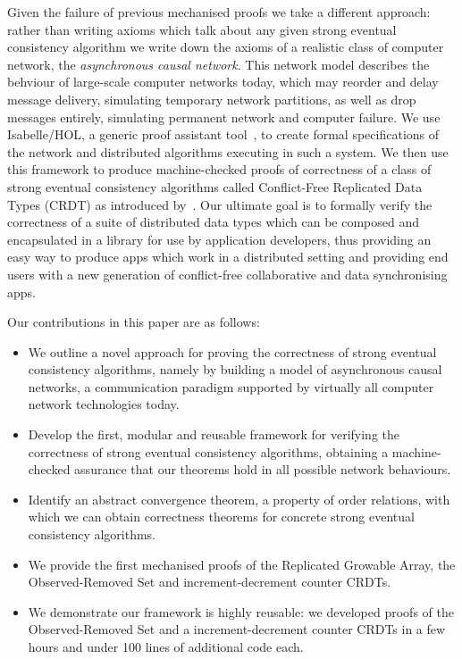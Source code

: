 \documentclass[acmlarge,review,anonymous]{acmart}\settopmatter{printfolios=true}
\begin{document}
Given the failure of previous mechanised proofs we take a different approach: rather than writing axioms which talk about any given strong eventual consistency algorithm we write down the axioms of a realistic class of computer network, the \emph{asynchronous causal network}.
This network model describes the behviour of large-scale computer networks today, which may reorder and delay message delivery, simulating temporary network partitions, as well as drop messages entirely, simulating permanent network and computer failure.
We use Isabelle/HOL, a generic proof assistant tool~\cite{DBLP:conf/tphol/WenzelPN08}, to create formal specifications of the network and distributed algorithms executing in such a system. 
We then use this framework to produce machine-checked proofs of correctness of a class of strong eventual consistency algorithms called Conflict-Free Replicated Data Types (CRDT) as introduced by~\citet{Shapiro:2011wy,Shapiro:2011un}. Our ultimate goal is to formally verify the correctness of a suite of distributed data types which can be composed and encapsulated in a library for use by application developers, thus providing an easy way to produce apps which work in a distributed setting and providing end users with a new generation of conflict-free collaborative and data synchronising apps.

Our contributions in this paper are as follows:
\begin{itemize}
\item We outline a novel approach for proving the correctness of strong eventual consistency algorithms, namely by building a model of asynchronous causal networks, a communication paradigm supported by virtually all computer network technologies today.
%
\item Develop the first, modular and reusable framework for verifying the correctness of strong eventual consistency algorithms, obtaining a machine-checked assurance that our theorems hold in all possible network behaviours.
%
\item Identify an abstract convergence theorem, a property of order relations, with which we can obtain correctness theorems for concrete strong eventual consistency algorithms.
%
\item We provide the first mechanised proofs of the Replicated Growable Array, the Observed-Removed Set and increment-decrement counter CRDTs. 
%
\item We demonstrate our framework is highly reusable: we developed proofs of the Observed-Removed Set and a increment-decrement counter CRDTs in a few hours and under 100 lines of additional code each.
\end{itemize}
\end{document}
